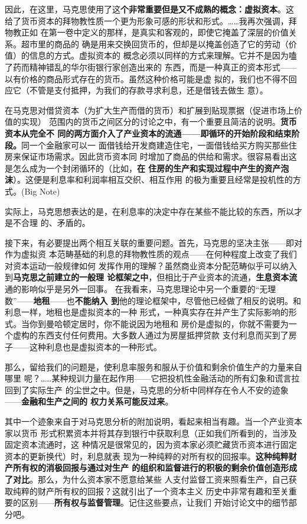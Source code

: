 因此，在这里，马克思使用了这\textbf{个非常重要但是又不成熟的概念：虚拟资本}。这
给了货币资本的拜物教性质一个更为形象可感的形状和形式。……我再次强调，拜物教正如
在第一卷中定义的那样，是真实和客观的，即使它掩盖了深层的价值关系。超市里的商品的
确是用来交换回货币的，但却是以掩盖创造了它的劳动（价值）的信息的方式。虚拟资本的
概念必须以同样的方式来理解。它并不是因为嗑了药而精神错乱的华尔街银行家创造出来的
东西，而是一种真正的资本形式——以有价格的商品形式存在的货币。虽然这种价格可能是虚
拟的，我们也不得不回应它（不管是支付抵押，为我们的存款寻求利息，还是借钱去做生
意）。

在马克思对借贷资本（为扩大生产而借的货币）和扩展到贴现票据（促进市场上价值的实现）
范围内的货币之间区分的讨论之中，有一个重要且简洁的说明。\textbf{货币资本从完全不
同的两方面介入了产业资本的流通——即循环的开始阶段和结束阶段。}同一个金融家可以一
面借钱给开发商建造住宅，一面借钱给买方购买那些住房来保证市场需求。因此货币资本同
时增加了商品的供给和需求。很容易看出这是怎么成为一个封闭循环的（比如，\textbf{在
住房的生产和实现过程中产生的资产泡沫}）。这便是利息率和利润率相互交织、相互作用
的极为重要且经常是投机性的方式。(Big Note)

实际上，马克思想表达的是，在利息率的决定中存在某些不能比较的东西，所以才是不合理
的、矛盾的。

接下来，有必要提出两个相互关联的重要问题。首先，马克思的坚决主张——即对作为虚拟资
本范畴基础的利息的拜物教性质的观点——在何种程度上改变了我们对资本运动一般规律如何
发挥作用的理解？虽然商业资本分配范畴似乎可以纳入到\textbf{马克思之前建立的一般理
论框架之中}，但相比于产业资本的流通，\textbf{生息资本流}通的影响似乎是另外一回事。
在我看来，马克思理论中另一个重要的“无理数”——\textbf{地租}——也\textbf{不能纳入
到}他的理论框架中，尽管他已经做了相反的说明。和利息一样，地租也是虚拟资本的一种
形式，一种真实存在并产生了实际影响的形式。当你到曼哈顿定居时，你不能说因为地租和
房价是虚拟的，你就不需要为一个虚构的东西支付任何费用。大多数人通过为房屋抵押贷款
支付利息而买到了房子——这种利息也是虚拟资本的一种形式。

那么，留给我们的问题是，使利息率服务和服从于价值和剩余价值生产的力量来自哪里
呢？……某种规训力量在起作用——它把投机性金融活动的所有幻象和谎言拉回到了实际生产
的尘世之中。但是，马克思的分析中同样存在令人不安的迹象——\textbf{金融和生产之间的
权力关系可能反过来}。

其中一个迹象来自于对马克思分析的附加说明，看起来相当有趣。当一个产业资本家以货币
形式积累资本并将其存到银行中获取利息（正如我们所看到的，当涉及固定资本流通时，这
种情况是很常见的，因为资本家必须贮藏货币资本进行固定资本的更新换代）时，利息就表
现为一种纯粹的对所有权的回报率。\textbf{这种纯粹财产所有权的消极回报与通过对生产
的组织和监督进行的积极的剩余价值创造形成了对比}。那么，为什么资本家不愿意给某些
人支付监督工资来照看生产，自己获取纯粹的财产所有权的回报？这就引出了一个资本主义
历史中非常有趣和至关重要的区别——\textbf{所有权与监督管理}。记住这些要点，让我们
开始讨论文中的细节部分吧。

